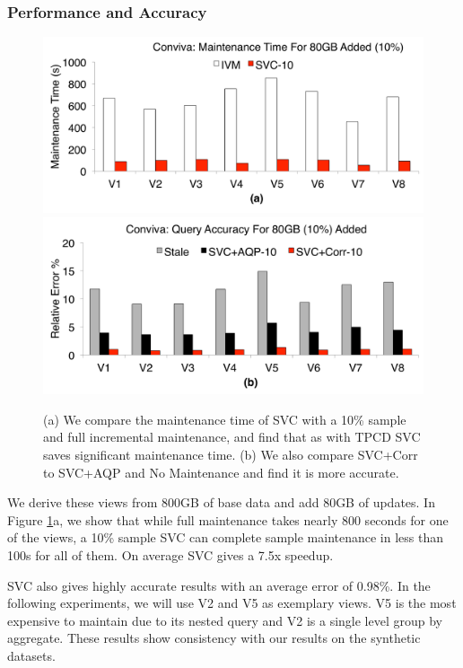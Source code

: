 \subsubsection{Performance and Accuracy}
\begin{figure}[t]
\centering
 \includegraphics[scale=0.15]{exp/con_3.pdf}
 \includegraphics[scale=0.15]{exp/con_4.pdf}
 \caption{(a) We compare the maintenance time of SVC with a 10\% sample and full incremental maintenance, and find that as with TPCD SVC saves significant maintenance time. (b) We also compare SVC+Corr to SVC+AQP and No Maintenance and find it is more accurate. \label{conv-1}}
\end{figure}
We derive these views from 800GB of base data and add 80GB of updates.
In Figure \ref{conv-1}a, we show that while full maintenance takes nearly 800 seconds for one of the views, a 10\% sample SVC can complete sample maintenance in less than 100s for all of them.
On average SVC gives a 7.5x speedup.

SVC also gives highly accurate results with an average error of 0.98\%.
In the following experiments, we will use V2 and V5 as exemplary views.
V5 is the most expensive to maintain due to its nested query and V2 is a single level group by aggregate.
These results show consistency with our results on the synthetic datasets.

